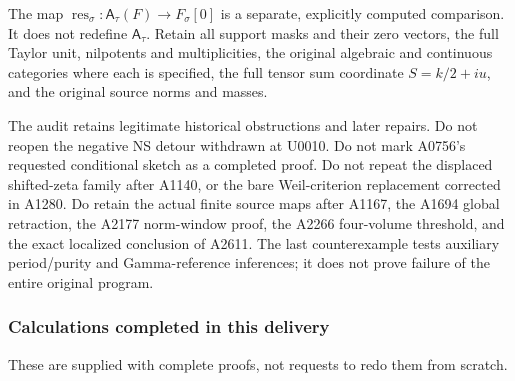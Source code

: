  

The map \(\operatorname{res}_\sigma:\mathsf A_\tau(F)\to F_\sigma[0]\)
is a separate, explicitly computed comparison. It does not redefine
\(\mathsf A_\tau\). Retain all support masks and their zero vectors, the
full Taylor unit, nilpotents and multiplicities, the original algebraic
and continuous categories where each is specified, the full tensor sum
coordinate \(S=k/2+iu\), and the original source norms and masses.

The audit retains legitimate historical obstructions and later repairs.
Do not reopen the negative NS detour withdrawn at U0010. Do not mark
A0756's requested conditional sketch as a completed proof. Do not repeat
the displaced shifted-zeta family after A1140, or the bare
Weil-criterion replacement corrected in A1280. Do retain the actual
finite source maps after A1167, the A1694 global retraction, the A2177
norm-window proof, the A2266 four-volume threshold, and the exact
localized conclusion of A2611. The last counterexample tests auxiliary
period/purity and Gamma-reference inferences; it does not prove failure
of the entire original program.

\subsubsection{Calculations completed in this
delivery}\label{calculations-completed-in-this-delivery}

These are supplied with complete proofs, not requests to redo them from
scratch.

